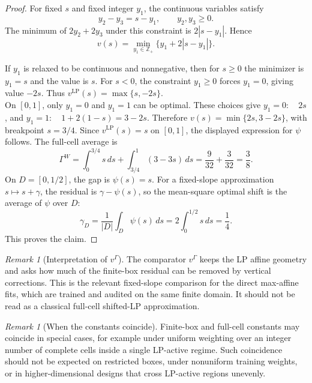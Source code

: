 \documentclass[11pt,letterpaper]{article}
\theoremstyle{definition}
\theoremstyle{remark}
\newtheorem{remark}[theorem]{Remark}
\newcommand{\LP}{\mathrm{LP}}
\begin{document}
\begin{proof}
For fixed $s$ and fixed integer $y_1$, the continuous variables satisfy
$$
y_2-y_3=s-y_1,
\qquad
y_2,y_3\ge0.
$$
The minimum of $2y_2+2y_3$ under this constraint is $2|s-y_1|$. Hence
$$
v(s)
=
\min_{y_1\in\mathbb Z_+}
\{y_1+2|s-y_1|\}.
$$

If $y_1$ is relaxed to be continuous and nonnegative, then for $s\ge0$ the
minimizer is $y_1=s$ and the value is $s$. For $s<0$, the constraint
$y_1\ge0$ forces $y_1=0$, giving value $-2s$. Thus
$
v^{\LP}(s)=\max\{s,-2s\}.
$\\
On $[0,1]$, only $y_1=0$ and $y_1=1$ can be optimal. These choices give
$
y_1=0:\quad 2s$, and $
y_1=1:\quad 1+2(1-s)=3-2s
$.
Therefore $v(s)=\min\{2s,3-2s\}$, with breakpoint $s=3/4$. Since
$v^{\LP}(s)=s$ on $[0,1]$, the displayed expression for $\psi$ follows.
The full-cell average is
$$
\Gamma^W
=
\int_0^{3/4}s\,ds
+
\int_{3/4}^{1}(3-3s)\,ds
=
\frac{9}{32}+\frac{3}{32}
=
\frac38.
$$
On $D=[0,1/2]$, the gap is $\psi(s)=s$. For a fixed-slope approximation
$s\mapsto s+\gamma$, the residual is $\gamma-\psi(s)$, so the mean-square
optimal shift is the average of $\psi$ over $D$:
$$
\gamma_D
=
\frac1{|D|}\int_D\psi(s)\,ds
=
2\int_0^{1/2}s\,ds
=
\frac14.
$$
This proves the claim.
\end{proof}
\begin{remark}[Interpretation of $v^\Gamma$]
\label{rem:finite_box_shifted_lp_interpretation}
The comparator $v^\Gamma$ keeps the LP affine geometry and asks how much of the
finite-box residual can be removed by vertical corrections. This is the
relevant fixed-slope comparison for the direct max-affine fits, which are
trained and audited on the same finite domain. It should not be read as a
classical full-cell shifted-LP approximation.
\end{remark}

\begin{remark}[When the constants coincide]
\label{rem:finite_box_full_cell_coincidence}
Finite-box and full-cell constants may coincide in special cases, for example
under uniform weighting over an integer number of complete cells inside a
single LP-active regime. Such coincidence should not be expected on restricted
boxes, under nonuniform training weights, or in higher-dimensional designs that
cross LP-active regions unevenly.
\end{remark}







\end{document}
